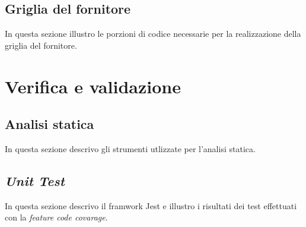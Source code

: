 \subsection{Griglia del fornitore}
In questa sezione illustro le porzioni di codice necessarie per la realizzazione della griglia del fornitore.

\section{Verifica e validazione}

\subsection{Analisi statica}
In questa sezione descrivo gli strumenti utlizzate per l'analisi statica.

\subsection{\emph{Unit Test}}
In questa sezione descrivo il framwork Jest e illustro i risultati dei test effettuati con la \emph{feature code covarage}.